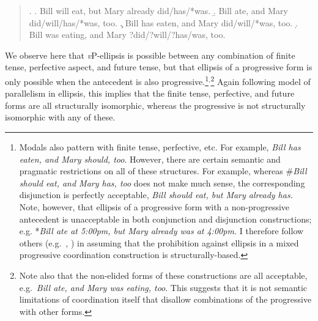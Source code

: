 \singlespacing
\begin{quote}
\begin{minipage}{5.5in}
\ex.
\a. Bill will eat, but Mary already did/has/*was.
\b. Bill ate, and Mary did/will/has/*was, too.
\c. Bill has eaten, and Mary did/will/*was, too.
\d. Bill was eating, and Mary ?did/?will/?has/was, too.\footnotemark

\end{minipage}
\end{quote}
\onehalfspacing
We observe here that {\it v}P-ellipsis is possible between any combination of finite tense, perfective aspect, and future tense, but that ellipsis of a progressive form is only possible when the antecedent is also progressive.\footnote{Modals also pattern with finite tense, perfective, etc. For example, {\it Bill has eaten, and Mary should, too}. However, there are certain semantic and pragmatic restrictions on all of these structures. For example, whereas \#{\it Bill should eat, and Mary has, too} does not make much sense, the corresponding disjunction is perfectly acceptable, {\it Bill should eat, but Mary already has.} Note, however, that ellipsis of a progressive form with a non-progressive antecedent is unacceptable in both conjunction and disjunction constructions; e.g. *{\it Bill ate at 5:00pm, but Mary already was at 4:00pm.} I therefore follow others (e.g.\ , ) in assuming that the prohibition against ellipsis in a mixed progressive coordination construction is structurally-based.}$^{,}$\footnote{Note also that the non-elided forms of these constructions are all acceptable, e.g.\ {\it Bill ate, and Mary was eating, too}. This suggests that it is not semantic limitations of coordination itself that disallow combinations of the progressive with other forms.} Again following  model of parallelism in ellipsis, this implies that the finite tense, perfective, and future forms are all structurally isomorphic, whereas the progressive is not structurally isomorphic with any of these. 

